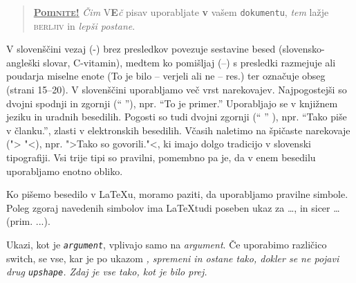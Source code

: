 \documentclass[12pt]{article}
\begin{document}
\vspace{2cm}
      \begin{quote}
        \underline{\textbf{Pom\textsc{nite}\Huge!}} \textit{Čim}
        \textsf{V\textbf{\LARGE E}}\textit{č} pisav \Huge uporabljate
         \footnotesize \textbf{v} vašem \small \texttt{dokumentu},
        \large \textit{tem} \normalsize lažje \textsc{berljiv} in
        \textsl{\textsf{lepši} pos\large t\Large a\LARGE n\huge e}.
      \end{quote}

\vspace{2cm}

V slovenščini vezaj (-) brez presledkov povezuje sestavine besed (slovensko-angleški slovar, C-vitamin), medtem ko pomišljaj (--) s presledki razmejuje ali poudarja miselne enote (To je bilo -- verjeli ali ne -- res.) ter označuje obseg (strani 15--20).
V slovenščini uporabljamo več vrst narekovajev. 
Najpogostejši so dvojni spodnji in zgornji ("` "'), npr. "`To je primer."' 
Uporabljajo se v knjižnem jeziku in uradnih besedilih. 
Pogosti so tudi dvojni zgornji (`` '' ), npr. ``Tako piše v članku.'', zlasti v elektronskih besedilih. Včasih naletimo na špičaste narekovaje ("> "<), npr. ">Tako so govorili."<, ki imajo dolgo tradicijo v slovenski tipografiji. 
Vsi trije tipi so pravilni, pomembno pa je, da v enem besedilu uporabljamo enotno obliko.

Ko pišemo besedilo v \LaTeX u, moramo paziti, da uporabljamo pravilne simbole. Poleg zgoraj navedenih simbolov ima \LaTeX tudi poseben ukaz za \dots, in sicer \dots{}  (prim. ...).

\vspace{2cm}

Ukazi, kot je \texttt{\textit{argument}},
  vplivajo samo na \textit{argument}. 
  Če uporabimo različico switch, se vse, 
  kar je po ukazom \texttt{\itshape} \itshape,  
  spremeni in ostane tako, dokler se ne pojavi drug \texttt{upshape}. 
  Zdaj je vse tako, kot je bilo prej.
\end{document}
